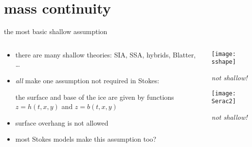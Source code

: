 
\section{mass continuity}

\begin{frame}{the most basic shallow assumption}

\begin{columns}

\begin{column}{0.6\textwidth}
\begin{itemize}
\item there are many shallow theories: SIA, SSA, hybrids, Blatter, \dots \nocite{Blatter}
\item \emph{all} make one assumption not required in Stokes:

\begin{center}
\alert{the surface and base of the ice are given by functions $z=h(t,x,y)$ and $z=b(t,x,y)$}
\end{center}
\item surface overhang is not allowed
\item most Stokes models make this assumption too?
\end{itemize}
\end{column}

\begin{column}{0.4\textwidth}
\texttt{[image: sshape]}

\scriptsize
\begin{center}
\emph{not shallow!}
\end{center}
\vspace{6mm}

\texttt{[image: Serac2]}

\begin{center}
\emph{not shallow!}
\end{center}
\end{column}
\end{columns}
\end{frame}


